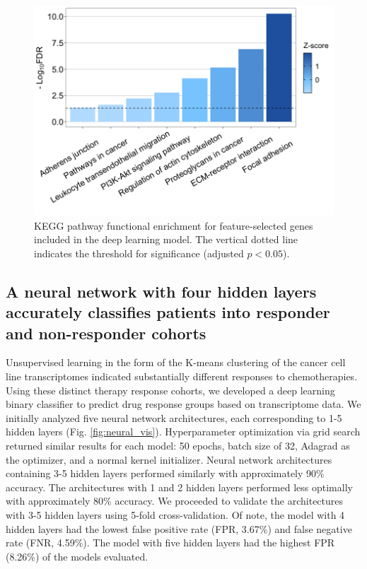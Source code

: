 \documentclass[10pt, letterpaper]{article}
\begin{document}
\begin{multicols*}{2}
\begin{figure}[!ht]
	\centering
	\includegraphics[width=\textwidth]{Figures/kegg.png}
	\caption{KEGG pathway functional enrichment for feature-selected genes included in the deep learning model. The vertical dotted line indicates the threshold for significance (adjusted $p < 0.05$).}
	\label{fig:kegg}
\end{figure}


\subsection*{A neural network with four hidden layers accurately classifies patients into responder and non-responder cohorts}
Unsupervised learning in the form of the K-means clustering of the cancer cell line transcriptomes indicated substantially different responses to chemotherapies. Using these distinct therapy response cohorts, we developed a deep learning binary classifier to predict drug response groups based on transcriptome data. We initially analyzed five neural network architectures, each corresponding to 1-5 hidden layers (Fig. \ref{fig:neural_vis}). Hyperparameter optimization via grid search returned similar results for each model: 50 epochs, batch size of 32, Adagrad as the optimizer, and a normal kernel initializer. Neural network architectures containing 3-5 hidden layers performed similarly with approximately 90\% accuracy. The architectures with 1 and 2 hidden layers performed less optimally with approximately 80\% accuracy. We proceeded to validate the architectures with 3-5 hidden layers using 5-fold cross-validation. Of note, the model with 4 hidden layers had the lowest false positive rate (FPR, 3.67\%) and false negative rate (FNR, 4.59\%). The model with five hidden layers had the highest FPR (8.26\%) of the models evaluated.


\end{multicols*}
\end{document}
